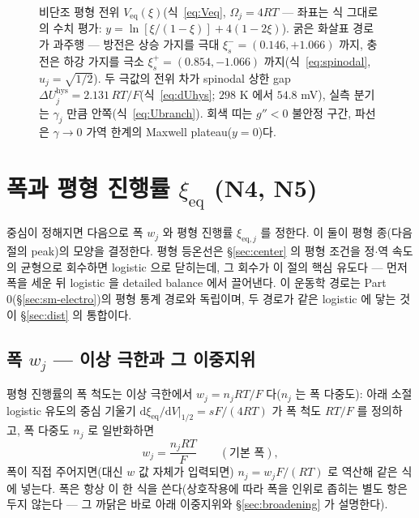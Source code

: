\documentclass[11pt,a4paper]{article}
\newcommand{\dd}{\mathrm{d}}
\newcommand{\eq}{\mathrm{eq}}
\newcommand{\hys}{\mathrm{hys}}
\begin{document}
\begin{figure}[t]
\caption{비단조 평형 전위 $V_\eq(\xi)$(식~\eqref{eq:Veq}, $\Omega_j=4RT$ --- 좌표는 식 그대로의 수치 평가:
$y=\ln[\xi/(1-\xi)]+4(1-2\xi)$). 굵은 화살표 경로가 과주행 --- 방전은 상승 가지를 극대 $\xi_s^-{=}(0.146,{+}1.066)$
까지, 충전은 하강 가지를 극소 $\xi_s^+{=}(0.854,{-}1.066)$ 까지(식~\eqref{eq:spinodal}, $u_j{=}\sqrt{1/2}$). 두 극값의
전위 차가 spinodal 상한 gap $\Delta U_j^\hys=2.131\,RT/F$(식~\eqref{eq:dUhys}; $298$ K 에서 $54.8$ mV), 실측 분기는
$\gamma_j$ 만큼 안쪽(식~\eqref{eq:Ubranch}). 회색 띠는 $g''<0$ 불안정 구간, 파선은 $\gamma\!\to\!0$ 가역 한계의 Maxwell
plateau($y{=}0$)다.}
\label{fig:hysloop}
\end{figure}

\section{폭과 평형 진행률 $\xi_\eq$ (N4, N5)}\label{sec:width}
중심이 정해지면 다음으로 폭 $w_j$ 와 평형 진행률 $\xi_{\eq,j}$ 를 정한다. 이 둘이 평형 종(다음 절의 peak)의 모양을
결정한다. 평형 등온선은 \S\ref{sec:center} 의 평형 조건을 정$\cdot$역 속도의 균형으로 회수하면 logistic 으로 닫히는데,
그 회수가 이 절의 핵심 유도다 — 먼저 폭을 세운 뒤 logistic 을 detailed balance 에서 끌어낸다. 이 운동학 경로는 Part 0(\S\ref{sec:sm-electro})의 평형 통계
경로와 독립이며, 두 경로가 같은 logistic 에 닿는 것이 \S\ref{sec:dist} 의 통합이다.

\subsection{폭 $w_j$ — 이상 극한과 그 이중지위}
평형 진행률의 폭 척도는 이상 극한에서 $w_j=n_jRT/F$ 다($n_j$ 는 폭 다중도): 아래 소절 logistic 유도의
중심 기울기 $\dd\xi_\eq/\dd V|_{1/2}=sF/(4RT)$ 가 폭 척도 $RT/F$ 를 정의하고, 폭 다중도 $n_j$ 로 일반화하면
\begin{equation}
w_j=\frac{n_jRT}{F}\qquad(\text{기본 폭}),
\label{eq:wbase}
\end{equation}
폭이 직접 주어지면(대신 $w$ 값 자체가 입력되면) $n_j=w_jF/(RT)$ 로 역산해 같은 식에 넣는다.
폭은 항상 이 한 식을 쓴다(상호작용에 따라 폭을 인위로 좁히는 별도 항은 두지 않는다 — 그 까닭은 바로 아래
이중지위와 \S\ref{sec:broadening} 가 설명한다).
\end{document}
